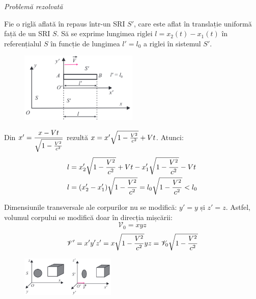 {\Large\emph{Problemă rezolvată}}
\vspace{0.5cm}

Fie o riglă aflată în repaus într-un SRI $S'$, care este aflat în translație
uniformă față de un SRI $S$. Să se exprime lungimea riglei \( l = x_2(t) - x_1(t) \)
în referențialul $S$ în funcție de lungimea \( l' = l_0 \)
a riglei în sistemul $S'$.

\begin{figure}[h]
    \centering
    \includegraphics[width=0.5\textwidth]{fig/rigla} \\
\end{figure}

Din \( x' = \dfrac{x - Vt}{\sqrt{1 - \frac{V^2}{c^2}}} \)
rezultă \( x = x' \sqrt{1 - \frac{V^2}{c^2}} + Vt \). Atunci:
\begin{align*}
    l &= x_2' \sqrt{1 - \frac{V^2}{c^2}} + Vt - x_1' \sqrt{1 - \frac{V^2}{c^2}} - Vt \\
    l &= (x_2' - x_1') \sqrt{1 - \frac{V^2}{c^2}} = l_0 \sqrt{1 - \frac{V^2}{c^2}} < l_0
\end{align*}

\parbreak

Dimensiunile transversale ale corpurilor nu se modifică: \( y' = y \) și \( z' = z \).
Astfel, volumul corpului se modifică doar în direcția mișcării:
\[ \mathscr{V}_0 = xyz \]
\[ \mathscr{V}' = x'y'z' = x\sqrt{1 - \frac{V^2}{c^2}} yz = \mathscr{V}_0 \sqrt{1 - \frac{V^2}{c^2}} \]

\begin{figure}
    \centering
    \includegraphics[width=0.4\textwidth]{fig/turtit.png}
\end{figure}

